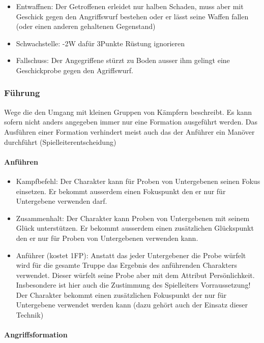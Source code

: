 \documentclass{article}
\begin{document}
\begin{itemize}
\item Entwaffnen: Der Getroffenen erleidet nur halben Schaden, muss aber mit Geschick gegen den Angriffswurf bestehen oder er lässt seine Waffen fallen (oder einen anderen gehaltenen Gegenstand)
\item Schwachstelle: -2W dafür 3Punkte Rüstung ignorieren
\item Fallschuss: Der Angegriffene stürzt zu Boden ausser ihm gelingt eine Geschickprobe gegen den Agriffswurf.
\end{itemize}

\subsubsection{Führung}

Wege die den Umgang mit kleinen Gruppen von Kämpfern beschreibt. Es kann sofern nicht anders angegeben immer nur eine
Formation ausgeführt werden. Das Ausführen einer Formation verhindert meist auch das der Anführer ein Manöver
durchführt (Spielleiterentscheidung)

\paragraph{Anführen}

\begin{itemize}
\item Kampfbefehl: Der Charakter kann für Proben von Untergebenen seinen Fokus einsetzen. Er bekommt ausserdem einen Fokuspunkt den er nur für Untergebene verwenden darf.
\item Zusammenhalt: Der Charakter kann Proben von Untergebenen mit seinem Glück unterstützen. Er bekommt ausserdem einen zusätzlichen Glückspunkt den er nur für Proben von Untergebenen verwenden kann.
\item Anführer (kostet 1FP): Anstatt das jeder Untergebener die Probe würfelt wird für die gesamte Truppe das Ergebnis des anführenden Charakters verwendet. Dieser würfelt seine Probe aber mit dem Attribut Persönlichkeit. Insbesondere ist hier auch die Zustimmung des Spielleiters Vorraussetzung! Der Charakter bekommt einen zusätzlichen Fokuspunkt der nur für Untergebene verwendet werden kann (dazu gehört auch der Einsatz dieser Technik)
\end{itemize}

\paragraph{Angriffsformation}
\end{document}
